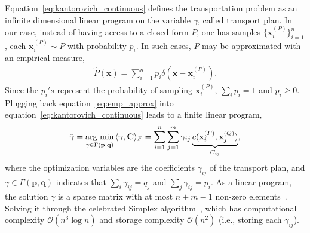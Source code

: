 Equation~\ref{eq:kantorovich_continuous} defines the transportation problem as an infinite dimensional linear program on the variable $\gamma$, called transport plan. In our case, instead of having access to a closed-form $P$, one has samples $\{\mathbf{x}_{i}^{(P)}\}_{i=1}^{n}$, each $\mathbf{x}_{i}^{(P)} \sim P$ with probability $p_{i}$. In such cases, $P$ may be approximated with an empirical measure,
\begin{align}
    \hat{P}(\mathbf{x}) = \sum_{i=1}^{n}p_{i}\delta(\mathbf{x} - \mathbf{x}_{i}^{(P)}).\label{eq:emp_approx}
\end{align}
Since the $p_{i}'s$ represent the probability of sampling $\mathbf{x}_{i}^{(P)}$, $\sum_{i}p_{i} = 1$ and $p_{i} \geq 0$. Plugging back equation~\ref{eq:emp_approx} into equation~\ref{eq:kantorovich_continuous} leads to a finite linear program,
\begin{align}
    \hat{\gamma} = \underset{\gamma \in \Gamma(\mathbf{p},\mathbf{q})}{\text{arg min}}\,\langle \gamma, \mathbf{C} \rangle_{F} = \sum_{i=1}^{n}\sum_{j=1}^{m}\gamma_{ij}\underbrace{c(\mathbf{x}_{i}^{(P)}, \mathbf{x}_{j}^{(Q)})}_{C_{ij}},\label{eq:kantorovich_discrete}
\end{align}
where the optimization variables are the coefficients $\gamma_{ij}$ of the transport plan, and $\gamma \in \Gamma(\mathbf{p}, \mathbf{q})$ indicates that $\sum_{i}\gamma_{ij} = q_{j}$ and $\sum_{j}\gamma_{ij} = p_{i}$. As a linear program, the solution $\gamma$ is a sparse matrix with at most $n + m - 1$ non-zero elements~\citep{peyre2020computationaloptimaltransport}. Solving it through the celebrated Simplex algorithm~\citep{dantzig1983reminiscences}, which has computational complexity $\mathcal{O}(n^{3}\log n)$ and storage complexity $\mathcal{O}(n^{2})$ (i.e., storing each $\gamma_{ij}$).

